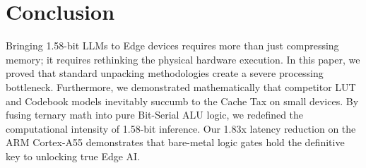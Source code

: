 \documentclass[10pt, conference]{IEEEtran}
\begin{document}
\section{Conclusion}
Bringing 1.58-bit LLMs to Edge devices requires more than just compressing memory; it requires rethinking the physical hardware execution. In this paper, we proved that standard unpacking methodologies create a severe processing bottleneck. Furthermore, we demonstrated mathematically that competitor LUT and Codebook models inevitably succumb to the Cache Tax on small devices. By fusing ternary math into pure Bit-Serial ALU logic, we redefined the computational intensity of 1.58-bit inference. Our 1.83x latency reduction on the ARM Cortex-A55 demonstrates that bare-metal logic gates hold the definitive key to unlocking true Edge AI. 



\end{document}
